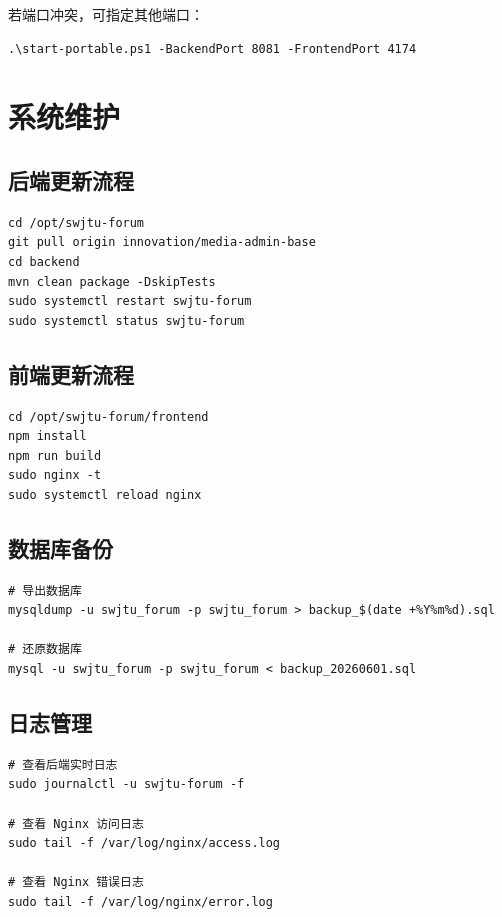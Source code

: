\documentclass[bwprint]{report}
\begin{document}
若端口冲突，可指定其他端口：

\begin{lstlisting}
.\start-portable.ps1 -BackendPort 8081 -FrontendPort 4174
\end{lstlisting}

\section{系统维护}

\subsection{后端更新流程}

\begin{lstlisting}
cd /opt/swjtu-forum
git pull origin innovation/media-admin-base
cd backend
mvn clean package -DskipTests
sudo systemctl restart swjtu-forum
sudo systemctl status swjtu-forum
\end{lstlisting}

\subsection{前端更新流程}

\begin{lstlisting}
cd /opt/swjtu-forum/frontend
npm install
npm run build
sudo nginx -t
sudo systemctl reload nginx
\end{lstlisting}

\subsection{数据库备份}

\begin{lstlisting}
# 导出数据库
mysqldump -u swjtu_forum -p swjtu_forum > backup_$(date +%Y%m%d).sql

# 还原数据库
mysql -u swjtu_forum -p swjtu_forum < backup_20260601.sql
\end{lstlisting}

\subsection{日志管理}

\begin{lstlisting}
# 查看后端实时日志
sudo journalctl -u swjtu-forum -f

# 查看 Nginx 访问日志
sudo tail -f /var/log/nginx/access.log

# 查看 Nginx 错误日志
sudo tail -f /var/log/nginx/error.log
\end{lstlisting}
\end{document}
